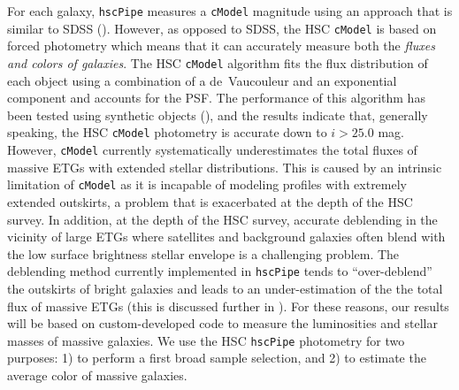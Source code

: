 \documentclass[a4paper,fleqn,usenatbib]{mnras}
\def\cmodel{\texttt{cModel}}
\begin{document}
    For each galaxy, \texttt{hscPipe} measures a \cmodel{} magnitude using an approach 
    that is similar to SDSS (\citealt{Bosch2017}). 
    However, as opposed to SDSS, the HSC \cmodel{} is based on forced photometry which 
    means that it can accurately measure both the \textit{fluxes and colors of galaxies}. 
    The HSC \cmodel{} algorithm fits the flux distribution of each object using a 
    combination of a de~Vaucouleur and an exponential component and accounts for the PSF. 
    The performance of this algorithm has been tested using synthetic objects 
    (\citealt{SynPipe}), and the results indicate that, generally speaking, 
    the HSC \cmodel{} photometry is accurate down to $i >25.0$ mag.  
    However, \cmodel{} currently systematically underestimates the total fluxes of 
    massive ETGs with extended stellar distributions. 
    This is caused by an intrinsic limitation of \cmodel{} as it is incapable of
    modeling profiles with extremely extended outskirts, a problem that is exacerbated 
    at the depth of the HSC survey. 
    In addition, at the depth of the HSC survey, accurate deblending in the vicinity of
    large ETGs where satellites and background galaxies often blend with the low surface 
    brightness stellar envelope is a challenging problem. 
    The deblending method currently implemented in \texttt{hscPipe} tends to 
    ``over-deblend'' the outskirts of bright galaxies and leads to an 
    under-estimation of the the total flux of massive ETGs (this is discussed further in 
    \citealt{Bosch2017}).  
    For these reasons, our results will be based on custom-developed code to measure 
    the luminosities and stellar masses of massive galaxies. 
    We use the HSC \texttt{hscPipe} photometry for two purposes: 
    1) to perform a first broad sample selection, and 2) to estimate the average 
    color of massive galaxies.
\end{document}
